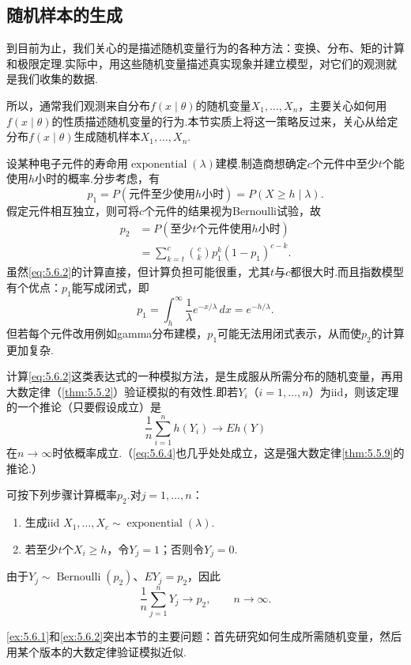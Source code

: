 \subsection{随机样本的生成}\label{sec:5.6}
到目前为止，我们关心的是描述随机变量行为的各种方法：变换、分布、矩的计算和极限定理.实际中，用这些随机变量描述真实现象并建立模型，对它们的观测就是我们收集的数据.

所以，通常我们观测来自分布$f(x\mid\theta)$的随机变量$X_1,\ldots,X_n$，主要关心如何用$f(x\mid\theta)$的性质描述随机变量的行为.本节实质上将这一策略反过来，关心从给定分布$f(x\mid\theta)$生成随机样本$X_1,\ldots,X_n$.
\begin{example}[指数寿命]\label{ex:5.6.1}
设某种电子元件的寿命用$\operatorname{exponential}(\lambda)$建模.制造商想确定$c$个元件中至少$t$个能使用$h$小时的概率.分步考虑，有
\begin{equation}\label{eq:5.6.1}
p_1=P(\text{元件至少使用$h$小时})=P(X\ge h\mid\lambda).
\end{equation}
假定元件相互独立，则可将$c$个元件的结果视为Bernoulli试验，故
\begin{equation}\label{eq:5.6.2}
\begin{aligned}p_2&=P(\text{至少$t$个元件使用$h$小时})\\
&=\sum_{k=t}^c\binom ck p_1^k(1-p_1)^{c-k}.
\end{aligned}
\end{equation}
虽然\eqref{eq:5.6.2}的计算直接，但计算负担可能很重，尤其$t$与$c$都很大时.而且指数模型有个优点：$p_1$能写成闭式，即
\begin{equation}\label{eq:5.6.3}
p_1=\int_h^\infty\frac1\lambda e^{-x/\lambda}\,dx=e^{-h/\lambda}.
\end{equation}
但若每个元件改用例如gamma分布建模，$p_1$可能无法用闭式表示，从而使$p_2$的计算更加复杂.
\end{example}
计算\eqref{eq:5.6.2}这类表达式的一种模拟方法，是生成服从所需分布的随机变量，再用大数定律（\autoref{thm:5.5.2}）验证模拟的有效性.即若$Y_i$（$i=1,\ldots,n$）为iid，则该定理的一个推论（只要假设成立）是
\begin{equation}\label{eq:5.6.4}
\frac1n\sum_{i=1}^n h(Y_i)\longrightarrow Eh(Y)
\end{equation}
在$n\to\infty$时依概率成立.（\eqref{eq:5.6.4}也几乎处处成立，这是强大数定律\autoref{thm:5.5.9}的推论.）
\begin{example}[续\autoref{ex:5.6.1}]\label{ex:5.6.2}
可按下列步骤计算概率$p_2$.对$j=1,\ldots,n$：
\begin{enumerate}[label=\textbf{\alph*.}]
\item 生成iid $X_1,\ldots,X_c\sim\operatorname{exponential}(\lambda)$.
\item 若至少$t$个$X_i\ge h$，令$Y_j=1$；否则令$Y_j=0$.
\end{enumerate}
由于$Y_j\sim\operatorname{Bernoulli}(p_2)$、$EY_j=p_2$，因此
$$\frac1n\sum_{j=1}^nY_j\to p_2,\qquad n\to\infty.$$
\end{example}
\autoref{ex:5.6.1}和\autoref{ex:5.6.2}突出本节的主要问题：首先研究如何生成所需随机变量，然后用某个版本的大数定律验证模拟近似.

